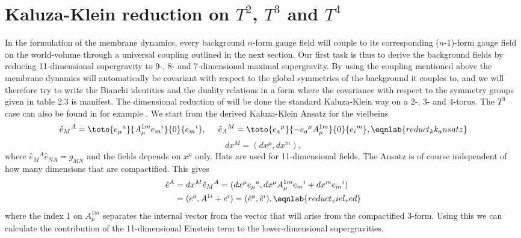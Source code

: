 \chapter{Kaluza-Klein reduction on $T^2$, $T^3$ and $T^4$}
\label{sec:reduct}
In the formulation of the membrane dynamics, every background $n$-form gauge 
field will couple to its corresponding ($n$-1)-form gauge field on the 
world-volume through a universal coupling outlined in the next section. Our 
first task is thus to derive the background fields by reducing 11-dimensional 
supergravity to 9-, 8- and 7-dimensional maximal supergravity. By using the coupling mentioned 
above the membrane dynamics will automatically be covariant with respect to the 
global symmetries of the background it couples to, and we will therefore try to write the Bianchi 
identities and the duality relations in a form where the covariance with respect to the symmetry groups 
given in table 2.3 is manifest. The dimensional reduction of  will be done the standard 
Kaluza-Klein way on a 2-, 3- and 4-torus. The $T^3$ case can also be found in for example \cite{artikeln}.
We start from the derived Kaluza-Klein Ansatz  for the vielbeins 
\begin{equation}
{\hat e}{_{M}}^A = \toto{ e{_{\mu}}^a }{ A_{\mu}^{1m}e{_{m}}^i
  }{ 0 }{ e{_{m}}^i}, \hspace{0.5cm} {\hat e}{_{A}}^M = \toto{ e{_{a}}^\mu }{
  -e{_{a}}^{\mu}A_{\mu}^{1m} }{ 0 }{ e{_{i}}^m},
\eqnlab{reduct_kk_ansatz}
\end{equation}
\[
dx^M = (dx^\mu,dx^m),
\]
where ${\hat e}{_M}^A {\hat e}{_{NA}} = {\hat g}_{MN}$ and the fields
depends on $x^\mu$ only. Hats are used for 11-dimensional
fields. The Ansatz is of course independent of how many dimensions that are compactified. This gives
\begin{align}
{\hat e}^A &= dx^M {\hat e}{_M}^A = (dx^\mu e{_\mu}^a,dx^\mu A_\mu^{1m} e{_{m}}^i + dx^m e{_{m}}^i) \nonumber \\
&= (e^a,A^{1i} + e^i) = ({\hat e}^a,{\hat e}^i),
\eqnlab{reduct_viel_red}
\end{align}
where the index 1 on $A_{\mu}^{1m}$ separates the internal vector from 
the vector that will arise from the compactified 3-form. Using this we can 
calculate the contribution of the 11-dimensional Einstein term to the lower-dimensional supergravities.

